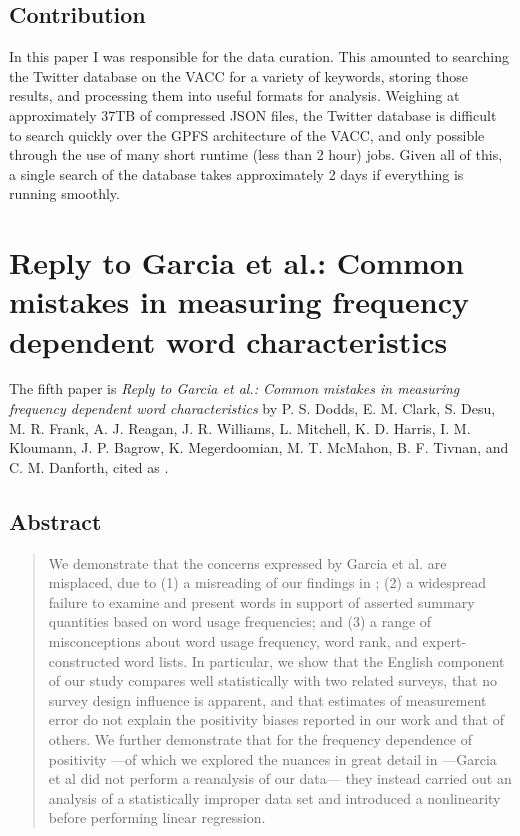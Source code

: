 \subsection{Contribution}

In this paper I was responsible for the data curation.
This amounted to searching the Twitter database on the VACC for a variety of keywords, storing those results, and processing them into useful formats for analysis.
Weighing at approximately 37TB of compressed JSON files, the Twitter database is difficult to search quickly over the GPFS architecture of the VACC, and only possible through the use of many short runtime (less than 2 hour) jobs.
Given all of this, a single search of the database takes approximately 2 days if everything is running smoothly.

\section{Reply to Garcia et al.: Common mistakes in measuring frequency dependent word characteristics}

The fifth paper is \textit{Reply to Garcia et al.: Common mistakes in measuring frequency dependent word characteristics} by P. S. Dodds, E. M. Clark, S. Desu, M. R. Frank, A. J. Reagan, J. R. Williams, L. Mitchell, K. D. Harris, I. M. Kloumann, J. P. Bagrow, K. Megerdoomian, M. T. McMahon, B. F. Tivnan, and C. M. Danforth, cited as \cite{dodds2015reply}.

\subsection{Abstract}
\begin{quote}
  We demonstrate that the concerns expressed by Garcia et al. are misplaced, due to
  (1) a misreading of our findings in \cite{dodds2015human};
  (2) a widespread failure to examine and present words in support of asserted summary quantities based on word usage frequencies;
  and (3) a range of misconceptions about word usage frequency, word rank, and expert-constructed word lists.
In particular, we show that the English component of our study compares well statistically with two related surveys, that no survey design influence is apparent, and that estimates of measurement error do not explain the positivity biases reported in our work and that of others.
We further demonstrate that for the frequency dependence of positivity
---of which we explored the nuances in great detail in \cite{dodds2015human}
---Garcia et al did not perform a reanalysis of our data---
they instead carried out an analysis of a
statistically improper data set and introduced a nonlinearity before performing linear regression.
\end{quote}

